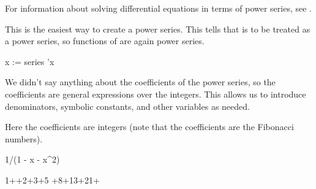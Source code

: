 {{{{{{{{{{{{{{For information about solving differential equations in terms of
power series, see .


\begin{xtc}
\begin{xtccomment}
This is the easiest way to create a power series.
This tells \Language{} that  is to be treated as a power series,
so functions of  are again power series.
\end{xtccomment}
\begin{spadsrc}
x := series 'x 
\end{spadsrc}
\begin{TeXOutput}
\begin{fricasmath}{1}
%
\end{fricasmath}
\end{TeXOutput}
\end{xtc}
%
We didn't say anything about the coefficients of the power
series, so the coefficients are general expressions over the integers.
This allows us to introduce denominators, symbolic constants, and other
variables as needed.
\begin{xtc}
\begin{xtccomment}
Here the coefficients are integers (note that the coefficients
are the Fibonacci
numbers).
\end{xtccomment}
\begin{spadsrc}
1/(1 - x - x^2) 
\end{spadsrc}
\begin{TeXOutput}
\begin{fricasmath}{2}
1++2\TIMES {}+3\TIMES {}+5%
\TIMES {}+8\TIMES {}+13\TIMES {}+21\TIMES {}+%
\end{fricasmath}
\end{TeXOutput}
\end{xtc}
\begin{xtc}
\begin{xtccomment}

\end{xtccomment}
\end{xtc}}}}}}}}}}}}}}}
